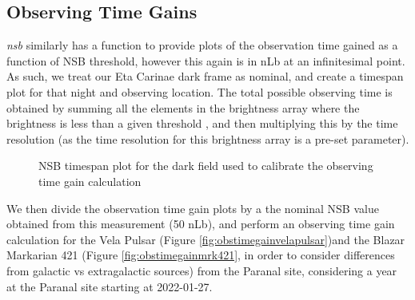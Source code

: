 \subsection{Observing Time Gains}
\textit{nsb} similarly has a function to provide plots of the observation time gained as a function of NSB threshold, however this again is in nLb at an infinitesimal point. As such, we treat our Eta Carinae dark frame as nominal, and create a timespan plot for that night and observing location. The total possible observing time is obtained by summing all the elements in the brightness array where the brightness is less than a given threshold , and then multiplying this by the time resolution (as the time resolution for this brightness array is a pre-set parameter).
\begin{figure}[ht]
\begin{centering}
\caption{NSB timespan plot for the dark field used to calibrate the observing time gain calculation }
\label{fig:timespan_dark}
\end{centering}
\end{figure}

We then divide the observation time gain plots by a the nominal NSB value obtained from this measurement (50 nLb), and perform an observing time gain calculation for the Vela Pulsar (Figure \ref{fig:obstimegainvelapulsar})and the Blazar Markarian 421 (Figure \ref{fig:obstimegainmrk421}, in order to consider differences from galactic vs extragalactic sources) from the Paranal site, considering a year at the Paranal site starting at 2022-01-27.

